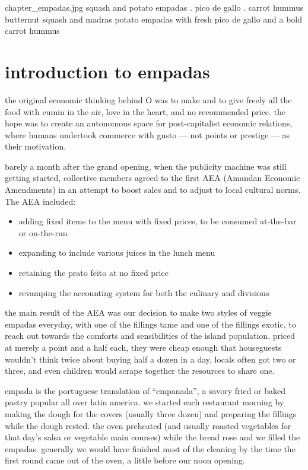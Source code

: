 \mychapter
{chapter_empadas.jpg}
{squash and potato empadas . pico de gallo . carrot hummus}
{butternut squash and madras potato empadas with fresh pico de gallo
and a bold carrot hummus}

\section{introduction to empadas}

the \gls{original economic thinking} behind O 
was to make and to give freely all the food with cumin in the air,
love in the heart, and no recommended price. the hope was to create an
autonomous space for post-capitalist economic relations, where humans
undertook commerce with gusto --- not points or prestige --- as their
motivation.

barely a month after the grand opening, when the publicity machine was
still getting started,  collective members agreed to the first
AEA (Amandan Economic Amendments) in an attempt to boost sales and to
adjust to local cultural norms. The AEA included:

\begin{itemize}
  \item adding fixed items to the menu with fixed prices, to be
  consumed at-the-bar or on-the-run

  \item expanding to include various juices in the lunch menu

  \item retaining the \gls{prato feito} at no fixed price

  \item revamping the accounting system for both the culinary and  divisions
\end{itemize}

the main result of the AEA was our decision to make two styles of
veggie empadas everyday, with one of the fillings tame and one of the
fillings exotic, to reach out towards the comforts and sensibilities
of the island population. priced at merely a point and a half each,
they were cheap enough that houseguests wouldn't think twice about
buying half a dozen in a day, locals often got two or three, and even
children would scrape together the resources to share one.

empada is the portuguese translation of ``empanada'', a savory fried
or baked pastry popular all over latin america. we started each
restaurant morning by making the dough for the covers (usually three
dozen) and preparing the fillings while the dough rested. the oven
preheated (and usually roasted vegetables for that day's salsa or
vegetable main courses) while the bread rose and we filled the
empadas. generally we would have finished most of the cleaning by the
time the first round came out of the oven, a little before our noon
opening.

